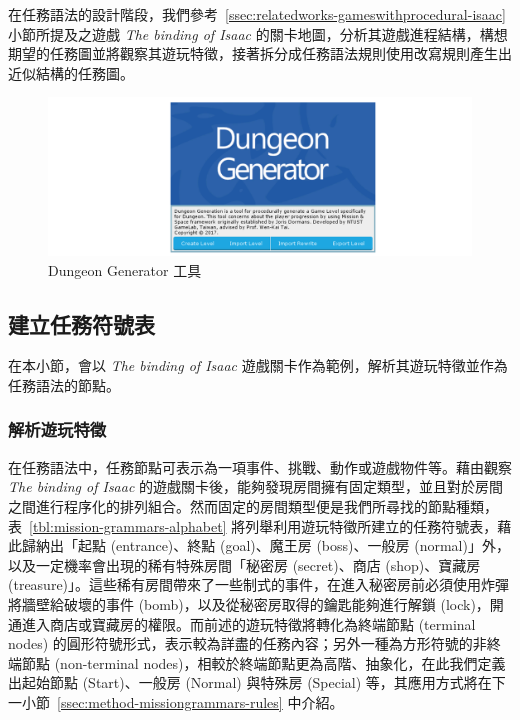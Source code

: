 在任務語法的設計階段，我們參考~\ref{ssec:relatedworks-gameswithprocedural-isaac} 小節所提及之遊戲 \textit{The binding of Isaac} 的關卡地圖，分析其遊戲進程結構，構想期望的任務圖並將觀察其遊玩特徵，接著拆分成任務語法規則使用改寫規則產生出近似結構的任務圖。

\begin{figure}[ht]
  \begin{center}
    \includegraphics[width=1.0\textwidth]{figures/Dungeon_Generator_工具.png}
    \caption{Dungeon Generator 工具} 
    \label{fig:dungeon-generator}
  \end{center}
\end{figure}

\subsection{建立任務符號表}
\label{ssec:method-missiongrammars-alphabet}

在本小節，會以 \textit{The binding of Isaac} 遊戲關卡作為範例，解析其遊玩特徵並作為任務語法的節點。

\subsubsection{解析遊玩特徵}
\label{sssec:method-missiongrammars-alphabet-extractpatterns}

在任務語法中，任務節點可表示為一項事件、挑戰、動作或遊戲物件等。藉由觀察 \textit{The binding of Isaac} 的遊戲關卡後，能夠發現房間擁有固定類型，並且對於房間之間進行程序化的排列組合。然而固定的房間類型便是我們所尋找的節點種類，表~\ref{tbl:mission-grammars-alphabet} 將列舉利用遊玩特徵所建立的任務符號表，藉此歸納出「起點 (entrance)、終點 (goal)、魔王房 (boss)、一般房 (normal)」外，以及一定機率會出現的稀有特殊房間「秘密房 (secret)、商店 (shop)、寶藏房 (treasure)」。這些稀有房間帶來了一些制式的事件，在進入秘密房前必須使用炸彈將牆壁給破壞的事件 (bomb)，以及從秘密房取得的鑰匙能夠進行解鎖 (lock)，開通進入商店或寶藏房的權限。而前述的遊玩特徵將轉化為終端節點 (terminal nodes) 的圓形符號形式，表示較為詳盡的任務內容；另外一種為方形符號的非終端節點 (non-terminal nodes)，相較於終端節點更為高階、抽象化，在此我們定義出起始節點 (Start)、一般房 (Normal) 與特殊房 (Special) 等，其應用方式將在下一小節~\ref{ssec:method-missiongrammars-rules} 中介紹。

